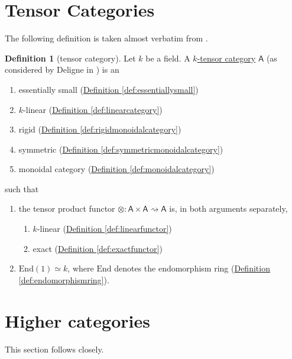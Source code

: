 \documentclass[a4paper]{report}
\newcommand{\defn}[1]{\ul{#1}}
\theoremstyle{definition}
\newtheorem{definition}{Definition}[section]
\theoremstyle{plain}
\theoremstyle{remark}
\begin{document}
\section{Tensor Categories}
The following definition is taken almost verbatim from \cite{nlab-deligne-theorem}.
\begin{definition}[tensor category]
  \label{def:tensorcategory}
  Let $k$ be a field. A \defn{$k$-tensor category} $\mathsf{A}$ (as considered by Deligne in \cite{deligne-categories-tensorielle}) is an
  \begin{enumerate}
    \item essentially small (\hyperref[def:essentiallysmall]{Definition \ref*{def:essentiallysmall}})

    \item $k$-linear (\hyperref[def:linearcategory]{Definition \ref*{def:linearcategory}})

    \item rigid (\hyperref[def:rigidmonoidalcategory]{Definition \ref*{def:rigidmonoidalcategory}})

    \item symmetric (\hyperref[def:symmetricmonoidalcategory]{Definition \ref*{def:symmetricmonoidalcategory}})

    \item monoidal category (\hyperref[def:monoidalcategory]{Definition \ref*{def:monoidalcategory}})
  \end{enumerate}
  such that 
  \begin{enumerate}
    \item the tensor product functor $\otimes\colon \mathsf{A} \times \mathsf{A} \rightsquigarrow \mathsf{A}$ is, in both arguments separately,
      \begin{enumerate}
        \item $k$-linear (\hyperref[def:linearfunctor]{Definition \ref*{def:linearfunctor}})

        \item exact (\hyperref[def:exactfunctor]{Definition \ref*{def:exactfunctor}})
      \end{enumerate}

    \item $\mathrm{End}(1) \simeq k$, where $\mathrm{End}$ denotes the endomorphism ring (\hyperref[def:endomorphismring]{Definition \ref*{def:endomorphismring}}).
  \end{enumerate}
\end{definition}

\section{Higher categories} \label{sec:highercategories}
This section follows \cite{baez-higher-categories} closely.
\end{document}
